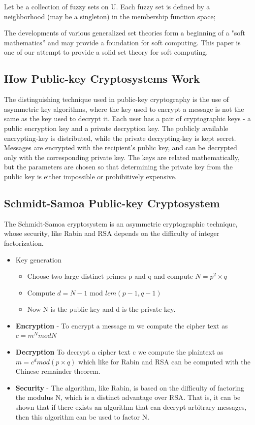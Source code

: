 \documentclass[12pt]{article} %
\begin{document}
Let be a collection of fuzzy sets on U. Each fuzzy set is defined by a neighborhood (may be a singleton) in the membership function space;







The developments of various generalized set theories form a
beginning of a "soft mathematics” and may provide a
foundation for soft computing. This paper is one of our
attempt to provide a solid set theory for soft computing.


\subsection{How Public-key Cryptosystems Work}
The distinguishing technique used in public-key cryptography is the use of asymmetric key algorithms, where the key used to encrypt a message is not the same as the key used to decrypt it. Each user has a pair of cryptographic keys - a public encryption key and a private decryption key. The publicly available encrypting-key is distributed, while the private decrypting-key is kept secret. Messages are encrypted with the recipient's public key, and can be decrypted only with the corresponding private key. The keys are related mathematically, but the parameters are chosen so that determining the private key from the public key is either impossible or prohibitively expensive. 


\subsection{Schmidt-Samoa Public-key Cryptosystem}
The Schmidt-Samoa cryptosystem is an asymmetric cryptographic technique, whose security, like Rabin and RSA depends on the difficulty of integer factorization.
\begin{itemize}
\item{Key generation}
\begin{itemize}
\item{}Choose two large distinct primes p and q and compute $N = p^2 \times q$
\item{}Compute $d = N-1$ mod $lcm(p - 1, q - 1)$
\item{}Now N is the public key and d is the private key.
 \end{itemize}


\item{\textbf{Encryption}} - 
To encrypt a message m we compute the cipher text as $c = m^N mod N$
 
\item{\textbf{Decryption}}
To decrypt a cipher text c we compute the plaintext as $m = c^d mod (p\times q)$ which like for Rabin and RSA can be computed with the Chinese remainder theorem.



\item{\textbf{Security}} - 
The algorithm, like Rabin, is based on the difficulty of factoring the modulus N, which is a distinct advantage over RSA. That is, it can be shown that if there exists an algorithm that can decrypt arbitrary messages, then this algorithm can be used to factor N.
\end{itemize}
\end{document}
